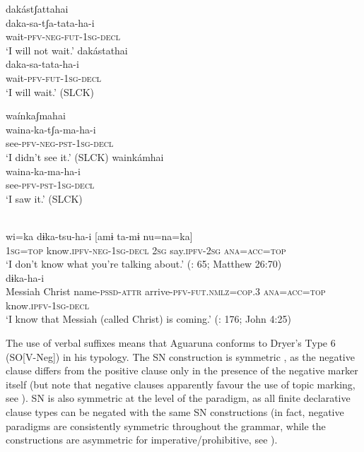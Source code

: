 \documentclass[output=paper,colorlinks,citecolor=brown,draft]{langscibook}
\begin{document}
\ea\label{ex:agu:1}
    \ea\label{ex:agu:1a}
        \glll dakástʃattahai \\ 
              daka-sa-tʃa-tata-ha-i \\
              wait-\textsc{pfv-neg-fut-1sg-decl} \\
        \glt ‘I will not wait.’ \citep[403]{Overall2017a}
    \ex\label{ex:agu:1b}
        \glll dakástathai \\
              daka-sa-tata-ha-i \\
              wait-\textsc{pfv-fut-1sg-decl} \\
        \glt ‘I will wait.’ (SLCK)
    \z
\z 

\ea\label{ex:agu:2}
    \ea\label{ex:agu:2a}
        \glll waínkaʃmahai \\ 
              waina-ka-tʃa-ma-ha-i \\
              see-\textsc{pfv-neg-pst-1sg-decl} \\
        \glt ‘I didn’t see it.’ (SLCK)
    \ex\label{ex:agu:2b}
        \glll wainkámhai \\
              waina-ka-ma-ha-i \\
              see-\textsc{pfv-pst-1sg-decl}\\
        \glt ‘I saw it.’ (SLCK)
    \z
\z  

\ea\label{ex:agu:3}
    \ea\label{ex:agu:3a}
         \\ 
              wi=ka  dɨka-tsu-ha-i  [amɨ  ta-mɨ nu=na=ka]\\
              \textsc{1sg}=\textsc{top}  know.\textsc{ipfv-neg-1sg-decl}  \textsc{2sg}  say.\textsc{ipfv-2sg} \textsc{ana=acc=top} \\
        \glt ‘I don’t know what you’re talking about.’ (\citealt{LigaBíblica2008}: 65; Matthew 26:70)
    \ex\label{ex:agu:3b}
         \\
              [\emph{mesías} Kristu  naa-hu-tinu  ta-a-tina=a nu=na=ka]  dɨka-ha-i \\ 
              Messiah  Christ  name-\textsc{pssd-attr}  arrive-\textsc{pfv-fut.nmlz=cop.3} \textsc{ana=acc=top}  know.\textsc{ipfv-1sg-decl}\\
        \glt ‘I know that Messiah (called Christ) is coming.’ (\citealt{LigaBíblica2008}: 176; John 4:25)
    \z
\z

The use of verbal suffixes means that Aguaruna conforms to Dryer's Type 6 (SO[V-Neg]) in his \citeyear{Dryer2013-wals144}  typology. The SN construction is symmetric \citep{Miestamo2005}, as the negative clause differs from the positive clause only in the presence of the negative marker itself (but note that negative clauses apparently favour the use of topic marking, see ). SN is also symmetric at the level of the paradigm, as all finite declarative clause types can be negated with the same SN constructions (in fact, negative paradigms are consistently symmetric throughout the grammar, while the constructions are asymmetric for imperative/prohibitive, see ).
\end{document}
